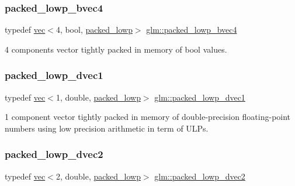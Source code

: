\subsubsection{\texorpdfstring{packed\+\_\+lowp\+\_\+bvec4}{packed\_lowp\_bvec4}}
{\footnotesize\ttfamily typedef \mbox{\hyperlink{structglm_1_1vec}{vec}}$<$4, bool, \mbox{\hyperlink{namespaceglm_a36ed105b07c7746804d7fdc7cc90ff25ac36a4bd74559be2c0b65bc48e5953b8b}{packed\+\_\+lowp}}$>$ \mbox{\hyperlink{group__gtc__type__aligned_ga7340a9bf8a974a263c6eaef48133331c}{glm\+::packed\+\_\+lowp\+\_\+bvec4}}}



4 components vector tightly packed in memory of bool values. 

\mbox{\label{group__gtc__type__aligned_gab43886895b98688f4ebbc395e5a633ff}} 
\subsubsection{\texorpdfstring{packed\+\_\+lowp\+\_\+dvec1}{packed\_lowp\_dvec1}}
{\footnotesize\ttfamily typedef \mbox{\hyperlink{structglm_1_1vec}{vec}}$<$1, double, \mbox{\hyperlink{namespaceglm_a36ed105b07c7746804d7fdc7cc90ff25ac36a4bd74559be2c0b65bc48e5953b8b}{packed\+\_\+lowp}}$>$ \mbox{\hyperlink{group__gtc__type__aligned_gab43886895b98688f4ebbc395e5a633ff}{glm\+::packed\+\_\+lowp\+\_\+dvec1}}}



1 component vector tightly packed in memory of double-\/precision floating-\/point numbers using low precision arithmetic in term of U\+L\+Ps. 

\mbox{\label{group__gtc__type__aligned_gae61fd7d54de0db35af2b3b7fde2971f2}} 
\subsubsection{\texorpdfstring{packed\+\_\+lowp\+\_\+dvec2}{packed\_lowp\_dvec2}}
{\footnotesize\ttfamily typedef \mbox{\hyperlink{structglm_1_1vec}{vec}}$<$2, double, \mbox{\hyperlink{namespaceglm_a36ed105b07c7746804d7fdc7cc90ff25ac36a4bd74559be2c0b65bc48e5953b8b}{packed\+\_\+lowp}}$>$ \mbox{\hyperlink{group__gtc__type__aligned_gae61fd7d54de0db35af2b3b7fde2971f2}{glm\+::packed\+\_\+lowp\+\_\+dvec2}}}



